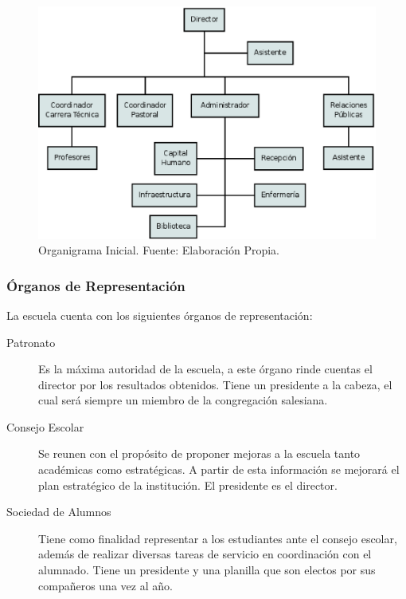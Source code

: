 \begin{figure}
	\centering
	\includegraphics[scale=0.7]{images/organigrama-inicial}
	\caption{Organigrama Inicial. Fuente: Elaboración Propia.}
	\label{fig:Org:Inicial}
\end{figure}


\clearpage

\subsubsection{Órganos de Representación}

La escuela cuenta con los siguientes órganos de representación:

\begin{description}
	\item[Patronato]
		Es la máxima autoridad de la escuela, a este órgano rinde cuentas el director por los resultados obtenidos. Tiene un presidente a la cabeza, el cual será siempre un miembro de la congregación salesiana.
	\item[Consejo Escolar]
		Se reunen con el propósito de proponer mejoras a la escuela tanto académicas como estratégicas. A partir de esta información se mejorará el plan estratégico de la institución. El presidente es el director.
	\item[Sociedad de Alumnos]
		Tiene como finalidad representar a los estudiantes ante el consejo escolar, además de realizar diversas tareas de servicio en coordinación con el alumnado. Tiene un presidente y una planilla que son electos por sus compañeros una vez al año.
\end{description}

